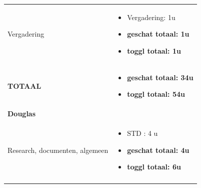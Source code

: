 \documentclass{article}
\begin{document}
\begin{center}
\begin{tabularx}{\textwidth}[t]{XX}
\arrayrulecolor{black}\hline

\vspace{2 mm}
Vergadering & 
\begin{minipage}[t]{\linewidth}%
\vspace{2 mm}
\begin{itemize}
\item Vergadering: 1u
\item \textbf{geschat totaal: 1u}
\item \textbf{toggl totaal: 1u}
\vspace{2 mm}
\end{itemize} 
\end{minipage}\\

\arrayrulecolor{black}\hline

\vspace{2 mm}
\textbf{TOTAAL} & 
\begin{minipage}[t]{\linewidth}%
\vspace{2 mm}
\begin{itemize}
\item \textbf{geschat totaal: 34u}
\item \textbf{toggl totaal: 54u}
\vspace{2 mm}
\end{itemize} 
\end{minipage}\\





\arrayrulecolor{green}\hline
\vspace{.1 mm}
\textbf{\textcolor{myGreen}{\large{Douglas}}} \vspace{.1 mm} & \\
\hline
\vspace{1 mm}
Research, documenten, algemeen & 
\begin{minipage}[t]{\linewidth}%
\vspace{1 mm}
\begin{itemize}
\item  STD : 4 u
\item \textbf{geschat totaal: 4u}
\item \textbf{toggl totaal: 6u}
\end{itemize} 
\vspace{1 mm}
\end{minipage}\\

\arrayrulecolor{black}\hline


\end{tabularx}
\end{center}
\end{document}
